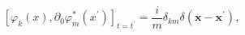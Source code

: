 \begin{equation}
\left[ \varphi_k(x),\partial_0 \varphi _{m}^{*}(x^{\prime
})\right] _{t=t^{\prime }}=\frac{i}{m}\delta _{km}\delta
(\mathbf{x}-\mathbf{x}^{\prime }) ,\label{87}
\end{equation}

